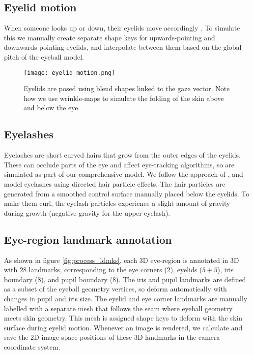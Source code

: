 \subsection{Eyelid motion}

When someone looks up or down, their eyelids move accordingly \cite{liversedge2011oxford}. To simulate this we manually create separate shape keys for upwards-pointing and downwards-pointing eyelids, and interpolate between them based on the global pitch of the eyeball model.

\begin{figure}
    \texttt{[image: eyelid\_motion.png]}
    \caption{Eyelids are posed using blend shapes linked to the gaze vector. Note how we use wrinkle-maps to simulate the folding of the skin above and below the eye.}
\end{figure}

\subsection{Eyelashes}

Eyelashes are short curved hairs that grow from the outer edges of the eyelids. These can occlude parts of the eye and affect eye-tracking algorithms, so are simulated as part of our comprehensive model. We follow the approach of \citet{swirski2014rendering}, and model eyelashes using directed hair particle effects. The hair particles are generated from a smoothed control surface manually placed below the eyelids. To make them curl, the eyelash particles experience a slight amount of gravity during growth (negative gravity for the upper eyelash).

\subsection{Eye-region landmark annotation}

As shown in figure \autoref{fig:process_ldmks}, each 3D eye-region is annotated in 3D with $28$ landmarks, corresponding to the eye corners ($2$), eyelids ($5\!+\!5$), iris boundary ($8$), and pupil boundary ($8$). The iris and pupil landmarks are defined as a subset of the eyeball geometry vertices, so deform automatically with changes in pupil and iris size. The eyelid and eye corner landmarks are manually labelled with a separate mesh that follows the seam where eyeball geometry meets skin geometry. This mesh is assigned shape keys to deform with the skin surface during eyelid motion.
%
%
Whenever an image is rendered, we calculate and save the 2D image-space positions of these 3D landmarks in the camera coordinate system.